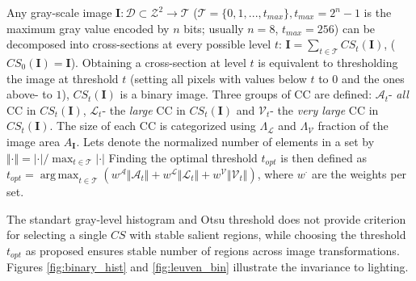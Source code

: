 \documentclass{article}
\def\I{{\mathbf I}}
\def\mcT{{\mathcal{T}}}
\def\mcD{{\mathcal{D}}}
\def\mcA{{\mathcal{A}}}
\def\mcL{{\mathcal{L}}}
\def\mcV{{\mathcal{V}}}
\DeclareMathOperator*{\argmax}{arg\,max}
\begin{document}
Any gray-scale image  $\I: \mcD \subset \mathcal{Z}^2 \rightarrow \mcT $ ($\mcT = \{0,1, ..., t_{max}\}, t_{max} = 2^n-1$ is the maximum
gray value encoded by $n$ bits; usually $n=8$, $t_{max} = 256$) can be decomposed into cross-sections at
every possible level $t$:  $\I = \sum_{t \in \mcT}CS_t(\I)$, 
($CS_0(\I) = \I$). Obtaining a cross-section at level $t$ is equivalent to thresholding the image at threshold $t$ (setting all pixels with values below $t$ to $0$ and the ones above- to $1$), $CS_t(\I)$ is a binary image. 
Three groups of CC are defined: $\mcA_t$- {\em all} CC in $CS_t(\I)$, $\mcL_t$- the {\em large} CC in $CS_t(\I)$ and 
$\mcV_t$- the {\em very large} CC in $CS_t(\I)$.  The size of each CC is categorized using $\Lambda_{\mcL}$ and $\Lambda_{\mcV}$ fraction of the image area $A_{\I}$. Lets denote the normalized number of elements in a set by $\Vert \cdot \Vert = |\cdot| / \max_{t \in \mcT}|\cdot|$
Finding the optimal threshold $t_{opt}$ is then defined as
$t_{opt} = \argmax_{t \in \mcT}( w^{\mcA} \Vert \mcA_t \Vert + w^{\mcL} \Vert \mcL_t \Vert + w^{\mcV} \Vert \mcV_t \Vert )$,
where $w^{\cdot}$ are the weights per set.  

The standart gray-level histogram and Otsu threshold does not provide criterion for selecting a single $CS$ with stable salient regions, while choosing the threshold $t_{opt}$ as proposed  ensures stable number of regions across image transformations. Figures \ref{fig:binary_hist} and \ref{fig:leuven_bin} illustrate the invariance to lighting.
 
\end{document}
